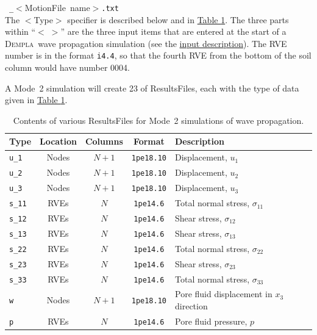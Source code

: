 \documentclass[letterpaper,11pt]{article}
\newcommand{\Dempla}{\textsc{Dempla}}
\newcommand{\MotionFile}{\textsf{MotionFile}}
\newcommand{\ResultsFile}{\textsf{ResultsFile}}
\begin{document}
\begin{itemize}
  \mbox{\quad%
  	\texttt{\_}$<$\MotionFile\ name$>$\texttt{.txt}}\\[0.5ex]
  The $<$Type$>$ specifier is described below and in
  \hyperref[table:ResultsFile]{Table \ref*{table:ResultsFile}}.
  The three parts within ``$<\;>$'' are the three input
  items that are entered at the start of a \Dempla\ wave
  propagation simulation
  (see the \hyperref[par:input]{input description}).
  The RVE number is in the format \texttt{i4.4}, so that the
  fourth RVE from the bottom of the soil column would have
  number 0004.
  \par
  A Mode~2 simulation will create 23 of
  \ResultsFile s, each with the type of data given in
  \hyperref[table:ResultsFile]{Table \ref*{table:ResultsFile}}.
  \begin{table}
  	\centering
    \caption{Contents of various \ResultsFile s for Mode~2
             simulations of wave propagation.
             \label{table:ResultsFile}}
    \begin{tabular}{lcccp{5cm}}
      \hline
      Type & Location & Columns & Format & Description\\
      \hline
      \texttt{u\_1} & Nodes & $N+1$ & \texttt{1pe18.10} &
        Displacement, $u_{1}$\\
      \texttt{u\_2} & Nodes & $N+1$ & \texttt{1pe18.10} &
        Displacement, $u_{2}$\\
      \texttt{u\_3} & Nodes & $N+1$ & \texttt{1pe18.10} &
        Displacement, $u_{3}$\\
      \texttt{s\_11} & RVEs & $N$ & \texttt{1pe14.6} &
        Total normal stress, $\sigma_{11}$\\
      \texttt{s\_12} & RVEs & $N$ & \texttt{1pe14.6} &
        Shear stress,  $\sigma_{12}$\\
      \texttt{s\_13} & RVEs & $N$ & \texttt{1pe14.6} &
        Shear stress,  $\sigma_{13}$\\
      \texttt{s\_22} & RVEs & $N$ & \texttt{1pe14.6} &
        Total normal stress, $\sigma_{22}$\\
      \texttt{s\_23} & RVEs & $N$ & \texttt{1pe14.6} &
        Shear stress,  $\sigma_{23}$\\
      \texttt{s\_33} & RVEs & $N$ & \texttt{1pe14.6} &
        Total normal stress, $\sigma_{33}$\\
      \texttt{w} & Nodes & $N+1$ & \texttt{1pe18.10} &
        Pore fluid displacement in $x_{3}$ direction\\
      \texttt{p} & RVEs & $N$ & \texttt{1pe14.6} &
        Pore fluid pressure, $p$\\

\end{tabular}
\end{table}
\end{itemize}
\end{document}
